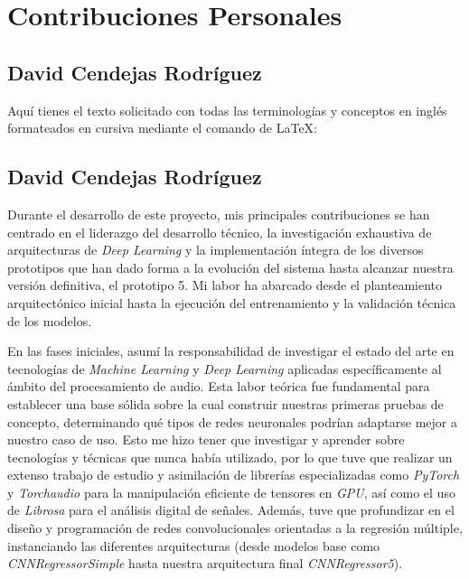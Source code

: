 \chapter*{Contribuciones Personales}
\label{cap:contribucionesPersonales}

\section*{David Cendejas Rodríguez}
Aquí tienes el texto solicitado con todas las terminologías y conceptos en inglés formateados en cursiva mediante el comando \textit{} de LaTeX:

\section*{David Cendejas Rodríguez}

Durante el desarrollo de este proyecto, mis principales contribuciones se han centrado en el liderazgo del desarrollo técnico, la investigación exhaustiva de arquitecturas de \textit{Deep Learning} y la implementación íntegra de los diversos prototipos que han dado forma a la evolución del sistema hasta alcanzar nuestra versión definitiva, el prototipo 5. Mi labor ha abarcado desde el planteamiento arquitectónico inicial hasta la ejecución del entrenamiento y la validación técnica de los modelos.

En las fases iniciales, asumí la responsabilidad de investigar el estado del arte en tecnologías de \textit{Machine Learning} y \textit{Deep Learning} aplicadas específicamente al ámbito del procesamiento de audio. Esta labor teórica fue fundamental para establecer una base sólida sobre la cual construir nuestras primeras pruebas de concepto, determinando qué tipos de redes neuronales podrían adaptarse mejor a nuestro caso de uso. Esto me hizo tener que investigar y aprender sobre tecnologías y técnicas que nunca había utilizado, por lo que tuve que realizar un extenso trabajo de estudio y asimilación de librerías especializadas como \textit{PyTorch} y \textit{Torchaudio} para la manipulación eficiente de tensores en \textit{GPU}, así como el uso de \textit{Librosa} para el análisis digital de señales. Además, tuve que profundizar en el diseño y programación de redes convolucionales orientadas a la regresión múltiple, instanciando las diferentes arquitecturas (desde modelos base como \textit{CNNRegressorSimple} hasta nuestra arquitectura final \textit{CNNRegressor5}).

